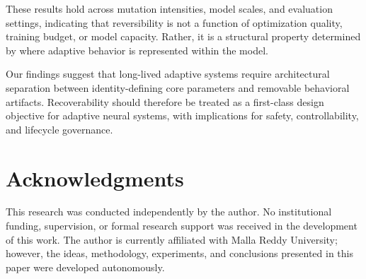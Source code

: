 \documentclass[10pt]{article}
\begin{document}
	These results hold across mutation intensities,
	model scales, and evaluation settings,
	indicating that reversibility is not a function of optimization quality,
	training budget, or model capacity.
	Rather, it is a structural property determined by
	where adaptive behavior is represented within the model.
	
	Our findings suggest that long-lived adaptive systems
	require architectural separation between identity-defining
	core parameters and removable behavioral artifacts.
	Recoverability should therefore be treated as a first-class
	design objective for adaptive neural systems,
	with implications for safety, controllability,
	and lifecycle governance.
	
	\section*{Acknowledgments}
	\label{ack}
	
	This research was conducted independently by the author. 
	No institutional funding, supervision, or formal research support was received in the development of this work. 
	The author is currently affiliated with Malla Reddy University; however, the ideas, methodology, experiments, and conclusions presented in this paper were developed autonomously.



\end{document}
